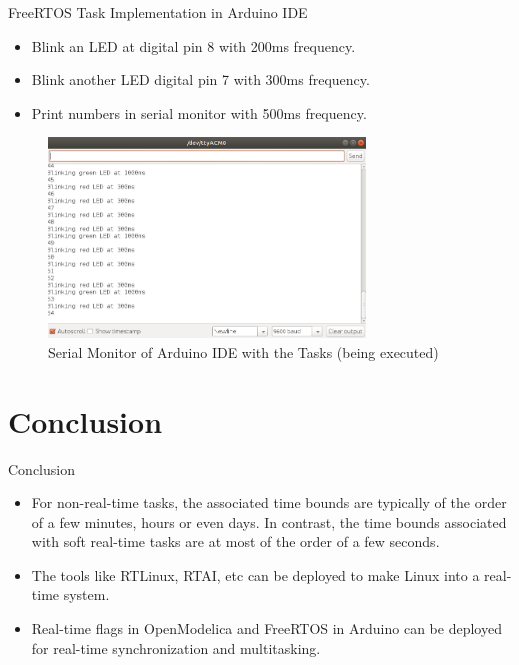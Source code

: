 \documentclass{beamer}
\begin{document}
\begin{frame}{FreeRTOS Task Implementation in Arduino IDE}
\begin{itemize}
    \item Blink an LED at digital pin 8 with 200ms frequency.
    \item Blink another LED digital pin 7 with 300ms frequency.
    \item Print numbers in serial monitor with 500ms frequency. 
\end{itemize}

\begin{figure}[h]
\centering
\includegraphics[width=0.75\textwidth]{images/Arduino-ide-tasks.png}
\caption{Serial Monitor of Arduino IDE with the Tasks (being executed)}
\end{figure}
\end{frame}

\section{Conclusion}
\begin{frame}{Conclusion}
\begin{itemize}
    \item For non-real-time tasks, the associated time bounds are typically of the order of a few minutes, hours or even days. In contrast, the time bounds associated with soft real-time tasks are at most of the order of a few seconds.
    \item The tools like RTLinux, RTAI, etc can be deployed to make Linux into a real-time system. 
    \item Real-time flags in OpenModelica and FreeRTOS in Arduino can be deployed for real-time synchronization and multitasking. 
\end{itemize}
    
\end{frame}
\end{document}
